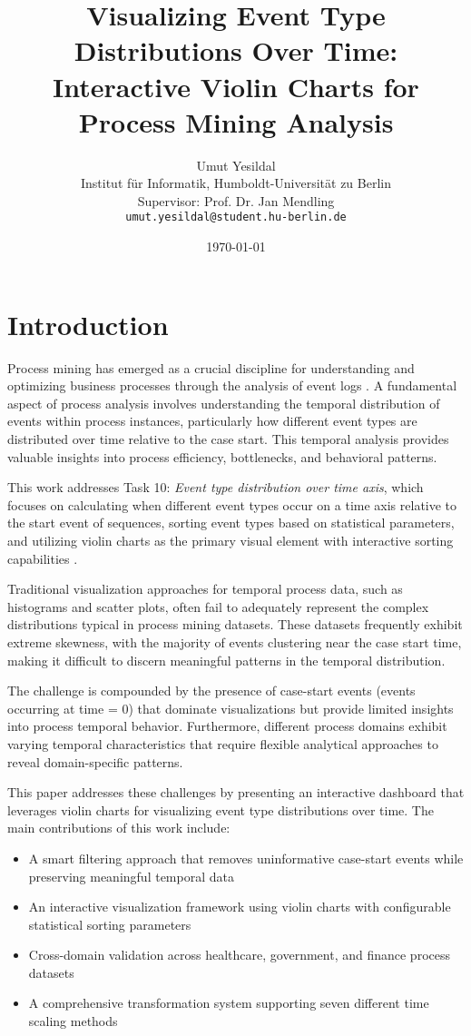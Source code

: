 \documentclass[11pt,a4paper]{article}
\title{Visualizing Event Type Distributions Over Time: Interactive Violin Charts for Process Mining Analysis}
\author{
    Umut Yesildal \\
    Institut für Informatik, Humboldt-Universität zu Berlin \\
    Supervisor: Prof. Dr. Jan Mendling \\
    \texttt{umut.yesildal@student.hu-berlin.de}
}
\date{\today}
\begin{document}
\maketitle

\section{Introduction}
\label{sec:introduction}

Process mining has emerged as a crucial discipline for understanding and optimizing business processes through the analysis of event logs \cite{aalst2016process}. A fundamental aspect of process analysis involves understanding the temporal distribution of events within process instances, particularly how different event types are distributed over time relative to the case start. This temporal analysis provides valuable insights into process efficiency, bottlenecks, and behavioral patterns.

This work addresses Task 10: \textit{Event type distribution over time axis}, which focuses on calculating when different event types occur on a time axis relative to the start event of sequences, sorting event types based on statistical parameters, and utilizing violin charts as the primary visual element with interactive sorting capabilities \cite{chen2015survey}.

Traditional visualization approaches for temporal process data, such as histograms and scatter plots, often fail to adequately represent the complex distributions typical in process mining datasets. These datasets frequently exhibit extreme skewness, with the majority of events clustering near the case start time, making it difficult to discern meaningful patterns in the temporal distribution.

The challenge is compounded by the presence of case-start events (events occurring at time = 0) that dominate visualizations but provide limited insights into process temporal behavior. Furthermore, different process domains exhibit varying temporal characteristics that require flexible analytical approaches to reveal domain-specific patterns.

This paper addresses these challenges by presenting an interactive dashboard that leverages violin charts for visualizing event type distributions over time. The main contributions of this work include:

\begin{itemize}
    \item A smart filtering approach that removes uninformative case-start events while preserving meaningful temporal data
    \item An interactive visualization framework using violin charts with configurable statistical sorting parameters
    \item Cross-domain validation across healthcare, government, and finance process datasets
    \item A comprehensive transformation system supporting seven different time scaling methods
\end{itemize}
\end{document}
